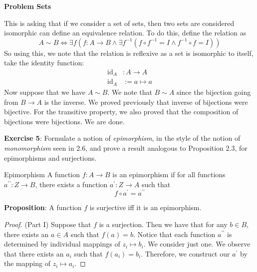 \documentclass{report}
\begin{document}
\begin{exercises}{\textbf{Problem Sets}}
    \begin{answer}
        This is asking that if we consider a set of sets, then two sets are considered isomorphic can define an equivalence relation. To do this, define the relation as
            \begin{equation*}
                A \sim B \iff \exists f (f : A \rightarrow B \land \exists f^{-1}(f \circ f^{-1} = I \land  f^{-1} \circ f = I))
            \end{equation*}
        So using this, we note that the relation is reflexive as a set is isomorphic to itself, take the identity function:
            \begin{align*}
                \text{id}_{A} &: A \rightarrow A \\
                \text{id}_{A} &:= a \mapsto a
            \end{align*}
        Now suppose that we have $A \sim B$. We note that $B \sim A$ since the bijection going from $B \rightarrow A$ is the inverse. We proved previously that inverse of bijections were bijective. For the transitive property, we also proved that the composition of bijections were bijections. We are done.
    \end{answer}

    \textbf{Exercise 5}: Formulate a notion of \textit{epimorphism}, in the style of the notion of \textit{monomorphism} seen in 2.6, and prove a result analogous to Proposition 2.3, for epimorphisms and surjections.
    \begin{definition}[]{Epimorphism}
        A function $f : A \rightarrow B$ is an epimorphism if for all functions $a^{\prime\prime}: Z \rightarrow B$, there exists a function $a^{\prime}: Z \rightarrow A$ such that
            \begin{equation*}
                f \circ a^{\prime} = a^{\prime\prime}
            \end{equation*}
    \end{definition}

    \textbf{Proposition}: A function $f$ is surjective iff it is an epimorphism.
        \begin{proof}
            (Part I) Suppose that $f$ is a surjection. Then we have that for any $b \in B$, there exists an $a \in A$ such that $f(a) = b$. Notice that each function $a^{\prime\prime}$ is determined by individual mappings of $z_{i} \mapsto b_{i}$. We consider just one. We observe that there exists an $a_{i}$ such that $f(a_{i}) = b_{i}$. Therefore, we construct our $a^{\prime}$ by the mapping of $z_{i} \mapsto a_{i}$.


\end{proof}
\end{exercises}
\end{document}
